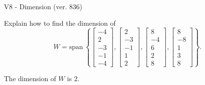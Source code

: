 \begin{exercise}
  \begin{exerciseTitle}V8 - Dimension (ver. 836)\end{exerciseTitle}
  \begin{exerciseStatement}
    Explain how to find the dimension of 
\[W=\mathrm{span}\ \left\{\left[\begin{array}{r}
-4 \\
2 \\
-3 \\
-1 \\
-4
\end{array}\right] , \left[\begin{array}{r}
2 \\
-3 \\
-1 \\
1 \\
2
\end{array}\right] , \left[\begin{array}{r}
8 \\
-4 \\
6 \\
2 \\
8
\end{array}\right] , \left[\begin{array}{r}
8 \\
-8 \\
1 \\
3 \\
8
\end{array}\right]\right\}.\]



  \end{exerciseStatement}
  \begin{exerciseAnswer}
   The dimension of \(W\) is  \(2\).
  


  \end{exerciseAnswer}
\end{exercise}